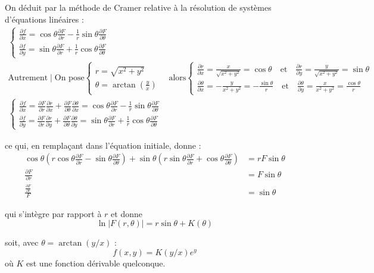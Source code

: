 \documentclass[12pt]{article}
\begin{document}
\begin{corrige}
On déduit par la méthode de Cramer relative à la résolution de systèmes d'équations linéaires :
$$
\begin{gathered}
\left\{\begin{array}{l}
\frac{\partial f}{\partial x} = \cos \theta \frac{\partial F}{\partial r} - \frac{1}{r} \sin \theta \frac{\partial F}{\partial \theta} \\
\frac{\partial f}{\partial y} = \sin \theta \frac{\partial F}{\partial r} + \frac{1}{r} \cos \theta \frac{\partial F}{\partial \theta}
\end{array}\right. \\
\text{Autrement} \mid \text{On pose}\left\{\begin{array}{l} 
r = \sqrt{x^{2} + y^{2}} \\
\theta = \arctan\left(\frac{y}{x}\right)
\end{array} \quad \text{alors} \left\{\begin{array}{l}
\frac{\partial r}{\partial x} = \frac{x}{\sqrt{x^{2}+y^{2}}} = \cos \theta \quad \text{et} \quad \frac{\partial r}{\partial y} = \frac{y}{\sqrt{x^{2}+y^{2}}} = \sin \theta \\
\frac{\partial \theta}{\partial x} = -\frac{y}{x^{2}+y^{2}} = -\frac{\sin \theta}{r} \quad \text{et} \quad \frac{\partial \theta}{\partial y} = \frac{x}{x^{2}+y^{2}} = \frac{\cos \theta}{r}
\end{array}\right.\right. \\
\left\{\begin{array}{l}
\frac{\partial f}{\partial x} = \frac{\partial F}{\partial r} \frac{\partial r}{\partial x} + \frac{\partial F}{\partial \theta} \frac{\partial \theta}{\partial x} = \cos \theta \frac{\partial F}{\partial r} - \frac{1}{r} \sin \theta \frac{\partial F}{\partial \theta} \\
\frac{\partial f}{\partial y} = \frac{\partial F}{\partial r} \frac{\partial r}{\partial y} + \frac{\partial F}{\partial \theta} \frac{\partial \theta}{\partial y} = \sin \theta \frac{\partial F}{\partial r} + \frac{1}{r} \cos \theta \frac{\partial F}{\partial \theta}
\end{array}\right.
\end{gathered}
$$

ce qui, en remplaçant dans l'équation initiale, donne :
$$
\begin{aligned}
\cos \theta\left(r \cos \theta \frac{\partial F}{\partial r} - \sin \theta \frac{\partial F}{\partial \theta}\right) + \sin \theta\left(r \sin \theta \frac{\partial F}{\partial r} + \cos \theta \frac{\partial F}{\partial \theta}\right) & = rF \sin \theta \\
\frac{\partial F}{\partial r} & = F \sin \theta \\
\frac{\frac{\partial F}{\partial r}}{F} & = \sin \theta
\end{aligned}
$$

qui s'intègre par rapport à $r$ et donne
$$
\ln |F(r, \theta)| = r \sin \theta + K(\theta)
$$

soit, avec $\theta = \arctan(y/x)$ :
$$
f(x, y) = K(y/x) e^{y}
$$
où $K$ est une fonction dérivable quelconque.
\end{corrige}
\end{document}
